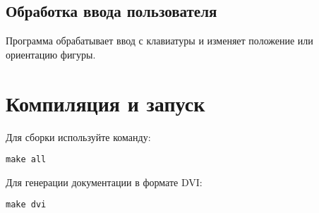 \documentclass[a4paper,12pt]{article}
\begin{document}
\subsection{Обработка ввода пользователя}
Программа обрабатывает ввод с клавиатуры и изменяет положение или ориентацию фигуры.

\section{Компиляция и запуск}
Для сборки используйте команду:
\begin{verbatim}
make all
\end{verbatim}

Для генерации документации в формате DVI:
\begin{verbatim}
make dvi
\end{verbatim}
\end{document}
